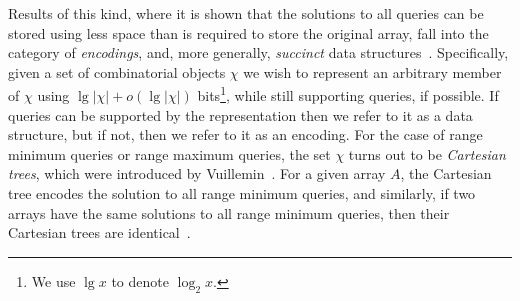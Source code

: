 \documentclass[runningheads]{llncs}
\begin{document}
Results of this kind, where it is shown that the solutions to all
queries can be stored using less space than is required to store the
original array, fall into the category of \emph{encodings}, and, more
generally, \emph{succinct} data structures~\cite{J89}.  Specifically,
given a set of combinatorial objects $\chi$ we wish to represent an
arbitrary member of $\chi$ using $\lg|\chi| + o(\lg|\chi|)$
bits\footnote{We use $\lg x$ to denote $\log_2 x$.}, while still
supporting queries, if possible.  If queries can be supported by the
representation then we refer to it as a data structure, but if not,
then we refer to it as an encoding.  For the case of range minimum
queries or range maximum queries, the set $\chi$ turns out to be
\emph{Cartesian trees}, which were introduced by Vuillemin~\cite{V80}.
For a given array $A$, the Cartesian tree encodes the solution to all
range minimum queries, and similarly, if two arrays have the same
solutions to all range minimum queries, then their Cartesian trees are
identical~\cite{FH11}.
\end{document}
